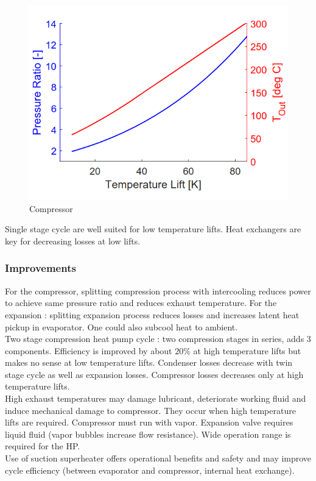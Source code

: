 \documentclass[../main.tex]{subfiles}
\begin{document}
\begin{figure}[hbt!]
    \centering
    \includegraphics[width=0.5\linewidth]{IMAGES/HP/Screenshot from 2025-03-20 10-35-32.png}
    \caption{Compressor}
\end{figure}
Single stage cycle are well suited for low temperature lifts. Heat exchangers are key for decreasing losses at low lifts. \\

\subsubsection{Improvements}
For the compressor, splitting compression process with intercooling reduces power to achieve same pressure ratio and reduces exhaust temperature. For the expansion : splitting expansion process reduces losses and increases latent heat pickup in evaporator. One could also subcool heat to ambient.\\

Two stage compression heat pump cycle : two compression stages in series, adds 3 components. Efficiency is improved by about $20\%$ at high temperature lifts but makes no sense at low temperature lifts. Condenser losses decrease with twin stage cycle as well as expansion losses. Compressor losses decreases only at high temperature lifts. \\

High exhaust temperatures may damage lubricant, deteriorate working fluid and induce mechanical damage to compressor. They occur when high temperature lifts are required. Compressor must run with vapor. Expansion valve requires liquid fluid (vapor bubbles increase flow resistance). Wide operation range is required for the HP. \\

Use of suction superheater offers operational benefits and safety and may improve cycle efficiency (between evaporator and compressor, internal heat exchange). \\
\end{document}
